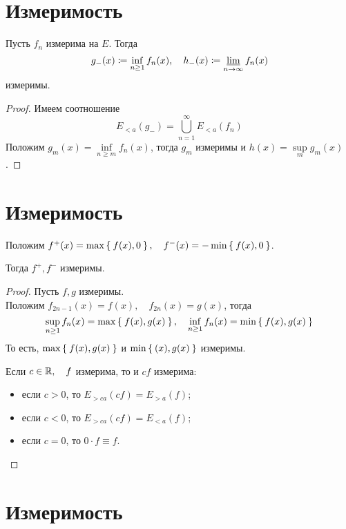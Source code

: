 \section{Измеримость }

\begin{property}
	Пусть $ f_n $ измерима на $ E $. Тогда
	$$ g_-(x) \coloneq \inf\limits_{n \ge 1} f_n(x), \quad h_-(x) \coloneq \varliminf_{n \to \infty} f_n(x) $$
	измеримы.
\end{property}

\begin{proof}
	Имеем соотношение
	$$ E_{<a}(g_-) = \bigcup_{n = 1}^\infty E_{<a}(f_n) $$
	Положим $ g_m(x) = \inf\limits_{n \ge m} f_n(x) $, тогда $ g_m $ измеримы и $ h(x) = \sup\limits_m g_m(x) $.
\end{proof}

\section{Измеримость }

\begin{property}
	Положим $ f^+(x) = \max \Set{f(x), 0}, \quad f^-(x) = -\min \Set{f(x), 0} $.

	Тогда $ f^+, f^- $ измеримы.
\end{property}

\begin{proof}
	Пусть $ f, g $ измеримы. \\
	Положим $ f_{2n - 1}(x) = f(x), \quad f_{2n}(x) = g(x) $, тогда
	$$ \sup\limits_{n \ge 1} f_n(x) = \max \Set{f(x), g(x)}, \quad \inf\limits_{n \ge 1} f_n(x) = \min \Set{f(x), g(x)} $$
	То есть, $ \max\Set{f(x), g(x)} $ и $ \min \Set{(x), g(x)} $ измеримы.

	Если $ c \in \mathbb{R}, \quad f $ измерима, то и $ cf $ измерима:
	\begin{itemize}
		\item если $ c > 0 $, то $ E_{>ca}(cf) = E_{>a}(f) $;
		\item если $ c < 0 $, то $ E_{>ca}(cf) = E_{<a}(f) $;
		\item если $ c = 0 $, то $ 0 \cdot f \equiv f $.
	\end{itemize}
\end{proof}

\section{Измеримость }

